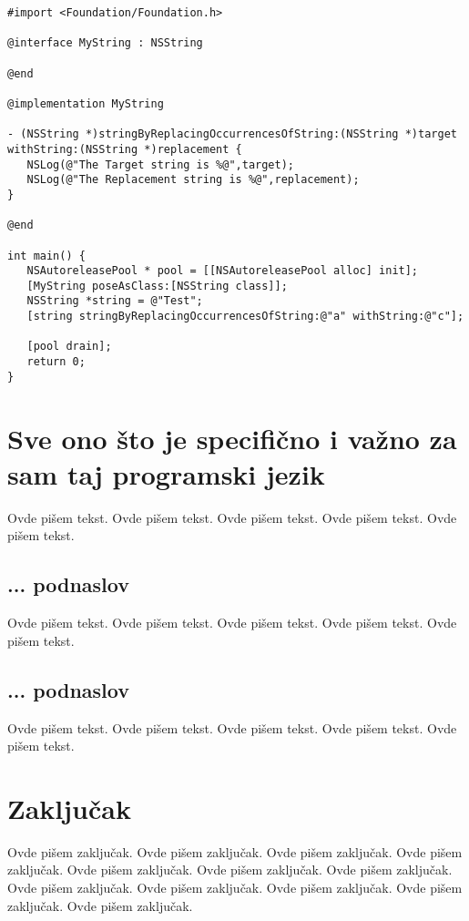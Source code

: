 \documentclass[a4paper]{article}
\begin{document}
\begin{lstlisting}[frame=single]
#import <Foundation/Foundation.h>

@interface MyString : NSString

@end

@implementation MyString

- (NSString *)stringByReplacingOccurrencesOfString:(NSString *)target
withString:(NSString *)replacement {
   NSLog(@"The Target string is %@",target);
   NSLog(@"The Replacement string is %@",replacement);
}

@end

int main() {
   NSAutoreleasePool * pool = [[NSAutoreleasePool alloc] init];
   [MyString poseAsClass:[NSString class]];
   NSString *string = @"Test";
   [string stringByReplacingOccurrencesOfString:@"a" withString:@"c"];
   
   [pool drain];
   return 0;
}
\end{lstlisting}

\section{Sve ono što je specifično i važno za sam taj programski jezik}
\label{sec:naslovN}

Ovde pišem tekst. 
Ovde pišem tekst. 
Ovde pišem tekst. 
Ovde pišem tekst. 
Ovde pišem tekst. 

\subsection{... podnaslov}
\label{subsec:podnaslovK}

Ovde pišem tekst. 
Ovde pišem tekst. 
Ovde pišem tekst. 
Ovde pišem tekst. 
Ovde pišem tekst. 

\subsection{... podnaslov}
\label{subsec:podnaslovM}

Ovde pišem tekst. 
Ovde pišem tekst. 
Ovde pišem tekst. 
Ovde pišem tekst. 
Ovde pišem tekst. 


\section{Zaključak}
\label{sec:zakljucak}

Ovde pišem zaključak. 
Ovde pišem zaključak. 
Ovde pišem zaključak. 
Ovde pišem zaključak. 
Ovde pišem zaključak. 
Ovde pišem zaključak. 
Ovde pišem zaključak. 
Ovde pišem zaključak. 
Ovde pišem zaključak. 
Ovde pišem zaključak. 
Ovde pišem zaključak. 
Ovde pišem zaključak. 
\end{document}
